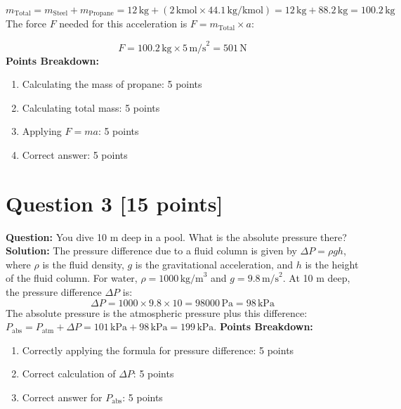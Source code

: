 \documentclass{article}
\begin{document}
\[
m_{\text{Total}} = m_{\text{Steel}} + m_{\text{Propane}} = 12 \, \text{kg} + (2 \, \text{kmol} \times 44.1 \, \text{kg/kmol}) = 12 \, \text{kg} + 88.2 \, \text{kg} = 100.2 \, \text{kg}
\]
\newline
The force \( F \) needed for this acceleration is \( F = m_{\text{Total}} \times a \):

\[
F = 100.2 \, \text{kg} \times 5 \, \text{m/s}^2 = 501 \, \text{N}
\]
\newline
\textbf{Points Breakdown:}
\begin{enumerate}
    \renewcommand{\labelenumi}{\alph{enumi})}
    \item Calculating the mass of propane: 5 points
    \item Calculating total mass: 5 points
    \item Applying \( F = ma \): 5 points
    \item Correct answer: 5 points
\end{enumerate}



\newpage
\section*{Question 3 [15 points]}
\textbf{Question:} You dive 10 m deep in a pool. What is the absolute pressure there?
\newline \newline
\textbf{Solution:} 
The pressure difference due to a fluid column is given by \( \Delta P = \rho g h \), where \( \rho \) is the fluid density, \( g \) is the gravitational acceleration, and \( h \) is the height of the fluid column.
\newline \newline
For water, \( \rho = 1000 \, \text{kg/m}^3 \) and \( g = 9.8 \, \text{m/s}^2 \). At 10 m deep, the pressure difference \( \Delta P \) is:
\[
\Delta P = 1000 \times 9.8 \times 10 = 98000 \, \text{Pa} = 98 \, \text{kPa}
\]
The absolute pressure is the atmospheric pressure plus this difference: \( P_{\text{abs}} = P_{\text{atm}} + \Delta P = 101 \, \text{kPa} + 98 \, \text{kPa} = 199 \, \text{kPa} \).
\newline \newline
\textbf{Points Breakdown:}
\begin{enumerate}
    \renewcommand{\labelenumi}{\alph{enumi})}
    \item Correctly applying the formula for pressure difference: 5 points
    \item Correct calculation of \( \Delta P \): 5 points
    \item Correct answer for \( P_{\text{abs}} \): 5 points
\end{enumerate}
\end{document}
